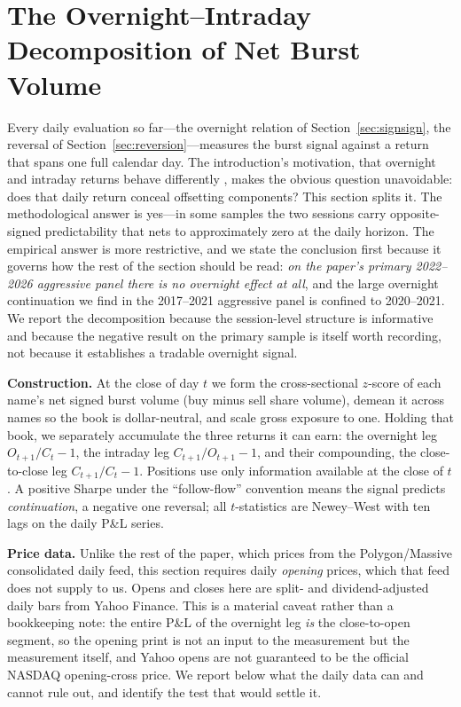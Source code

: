 \documentclass[11pt]{article}
\begin{document}
\section{The Overnight--Intraday Decomposition of Net Burst Volume}
\label{sec:tugofwar}
Every daily evaluation so far---the overnight relation of Section~\ref{sec:signsign}, the reversal of Section~\ref{sec:reversion}---measures the burst signal against a return that spans one full calendar day. The introduction's motivation, that overnight and intraday returns behave differently \citep{lou2019}, makes the obvious question unavoidable: does that daily return conceal offsetting components? This section splits it. The methodological answer is yes---in some samples the two sessions carry opposite-signed predictability that nets to approximately zero at the daily horizon. The empirical answer is more restrictive, and we state the conclusion first because it governs how the rest of the section should be read: \emph{on the paper's primary 2022--2026 aggressive panel there is no overnight effect at all}, and the large overnight continuation we find in the 2017--2021 aggressive panel is confined to 2020--2021. We report the decomposition because the session-level structure is informative and because the negative result on the primary sample is itself worth recording, not because it establishes a tradable overnight signal.

\textbf{Construction.} At the close of day $t$ we form the cross-sectional $z$-score of each name's net signed burst volume (buy minus sell share volume), demean it across names so the book is dollar-neutral, and scale gross exposure to one. Holding that book, we separately accumulate the three returns it can earn: the overnight leg $O_{t+1}/C_t-1$, the intraday leg $C_{t+1}/O_{t+1}-1$, and their compounding, the close-to-close leg $C_{t+1}/C_t-1$. Positions use only information available at the close of $t$. A positive Sharpe under the ``follow-flow'' convention means the signal predicts \emph{continuation}, a negative one reversal; all $t$-statistics are Newey--West with ten lags on the daily P\&L series.

\textbf{Price data.} Unlike the rest of the paper, which prices from the Polygon/Massive consolidated daily feed, this section requires daily \emph{opening} prices, which that feed does not supply to us. Opens and closes here are split- and dividend-adjusted daily bars from Yahoo Finance. This is a material caveat rather than a bookkeeping note: the entire P\&L of the overnight leg \emph{is} the close-to-open segment, so the opening print is not an input to the measurement but the measurement itself, and Yahoo opens are not guaranteed to be the official NASDAQ opening-cross price. We report below what the daily data can and cannot rule out, and identify the test that would settle it.
\end{document}

